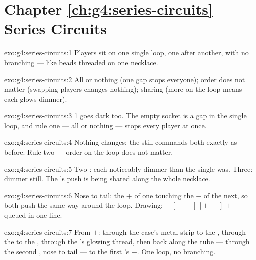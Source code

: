 \section*{Chapter \ref{ch:g4:series-circuits} --- Series Circuits}

\begin{solution}{exo:g4:series-circuits:1}
Players sit on one single loop, one after another, with no
branching --- like beads threaded on one necklace.
\end{solution}

\begin{solution}{exo:g4:series-circuits:2}
All or nothing (one gap stops everyone); order does not matter
(swapping players changes nothing); sharing (more  on the loop
means each glows dimmer).
\end{solution}

\begin{solution}{exo:g4:series-circuits:3}
 1 goes dark too. The empty socket is a gap in the single loop,
and rule one --- all or nothing --- stops every player at once.
\end{solution}

\begin{solution}{exo:g4:series-circuits:4}
Nothing changes: the  still commands both  exactly as
before. Rule two --- order on the loop does not matter.
\end{solution}

\begin{solution}{exo:g4:series-circuits:5}
Two : each noticeably dimmer than the single  was. Three:
dimmer still. The 's push is being shared along the whole
necklace.
\end{solution}

\begin{solution}{exo:g4:series-circuits:6}
Nose to tail: the $+$ of one touching the $-$ of the next, so both
push the same way around the loop. Drawing: $-\,[{+}\;{-}]\,[{+}\;
{-}]\,+$ queued in one line.
\end{solution}

\begin{solution}{exo:g4:series-circuits:7}
From $+$: through the case's metal strip to the ,
through the  to the , through the 's glowing thread,
then back along the tube --- through the second , nose to
tail --- to the first 's $-$. One loop, no branching.
\end{solution}

